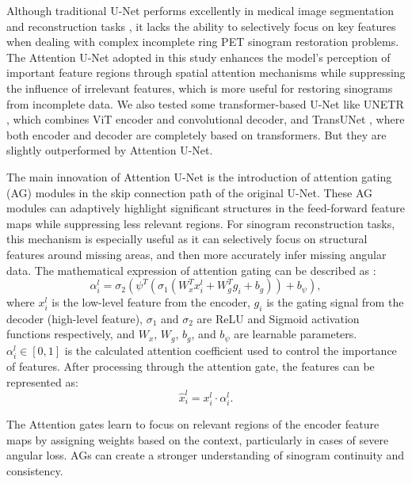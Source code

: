 \documentclass[
reprint,
superscriptaddress,
nofootinbib,
amsmath,amssymb,
aps,
prd,
]{revtex4-2}
\begin{document}
Although traditional U-Net performs excellently in medical image segmentation and reconstruction tasks \cite{ronneberger2015unetconvolutionalnetworksbiomedical}, it lacks the ability to selectively focus on key features when dealing with complex incomplete ring PET sinogram restoration problems. The Attention U-Net \cite{oktay2018attentionunetlearninglook} adopted in this study enhances the model's perception of important feature regions through spatial attention mechanisms while suppressing the influence of irrelevant features, which is more useful for restoring sinograms from incomplete data. We also tested some transformer-based U-Net like UNETR \cite{hatamizadeh2021unetrtransformers3dmedical}, which combines ViT encoder and convolutional decoder, and TransUNet \cite{chen2021transunettransformersmakestrong}, where both encoder and decoder are completely based on transformers. But they are slightly outperformed by Attention U-Net.

The main innovation of Attention U-Net is the introduction of attention gating (AG) modules in the skip connection path of the original U-Net. These AG modules can adaptively highlight significant structures in the feed-forward feature maps while suppressing less relevant regions. 
For sinogram reconstruction tasks, this mechanism is especially useful as it can selectively focus on structural features around missing areas, and then more accurately infer missing angular data. The mathematical expression of attention gating can be described as \cite{oktay2018attentionunetlearninglook}:
\begin{equation}
\alpha_i^l = \sigma_2(\psi^T(\sigma_1(W_x^T x_i^l + W_g^T g_i + b_g)) + b_\psi),
\end{equation}
where $x_i^l$ is the low-level feature from the encoder, $g_i$ is the gating signal from the decoder (high-level feature), $\sigma_1$ and $\sigma_2$ are ReLU and Sigmoid activation functions respectively, and $W_x$, $W_g$, $b_g$, and $b_\psi$ are learnable parameters. $\alpha_i^l \in [0,1]$ is the calculated attention coefficient used to control the importance of features.
After processing through the attention gate, the features can be represented as:
\begin{equation}
\hat{x}_i^l = x_i^l \cdot \alpha_i^l.
\end{equation}

The Attention gates learn to focus on relevant regions of the encoder feature maps by assigning weights based on the context, particularly in cases of severe angular loss. AGs can create a stronger understanding of sinogram continuity and consistency.
\end{document}
